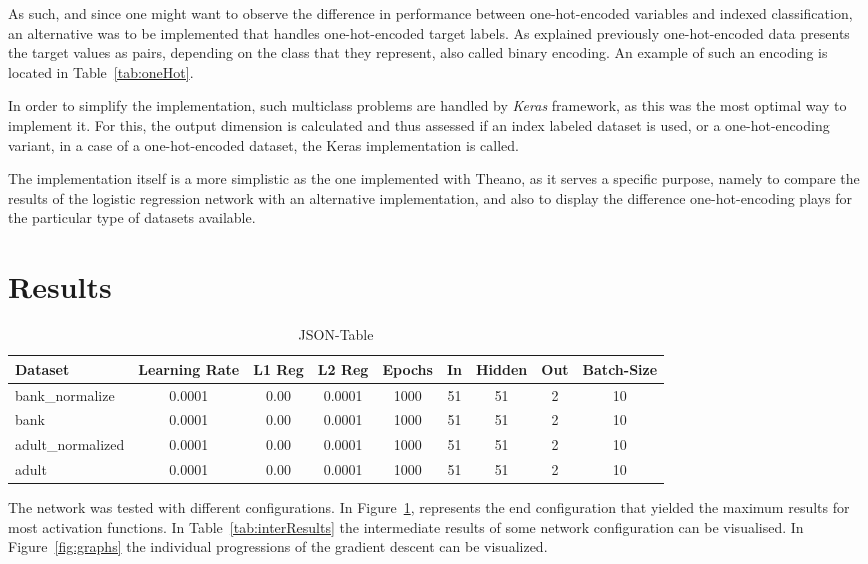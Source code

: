 \documentclass[12pt]{article}
\begin{document}
As such, and since one might want to observe the difference in performance between one-hot-encoded variables and indexed classification, an alternative was to be implemented that handles one-hot-encoded target labels. As explained previously one-hot-encoded data presents the target values as pairs, depending on the class that they represent, also called binary encoding. An example of such an encoding is located in Table~\ref{tab:oneHot}.

In order to simplify the implementation, such multiclass problems are handled by \emph{Keras} framework, as this was the most optimal way to implement it. For this, the output dimension is calculated and thus assessed if an index labeled dataset is used, or a one-hot-encoding variant, in a case of a one-hot-encoded dataset, the Keras implementation is called. 

The implementation itself is a more simplistic as the one implemented with Theano, as it serves a specific purpose, namely to compare the results of the logistic regression network with an alternative implementation, and also to display the difference one-hot-encoding plays for the particular type of datasets available.

\section{Results}
\label{sec:results}

\begin{table}[h]
   \centering
   \caption{JSON-Table}
   \label{tab:JSON}
   \begin{tabular}{lcccccccc}\toprule
        Dataset & Learning Rate & L1 Reg & L2 Reg & Epochs & In & Hidden & Out & Batch-Size \\
        \midrule
        bank\_normalize & 0.0001 & 0.00 & 0.0001 & 1000 & 51 & 51 & 2 & 10 \\
        bank & 0.0001 & 0.00 & 0.0001 & 1000 & 51 & 51 & 2 & 10 \\
        adult\_normalized & 0.0001 & 0.00 & 0.0001 & 1000 & 51 & 51 & 2 & 10 \\
        adult & 0.0001 & 0.00 & 0.0001 & 1000 & 51 & 51 & 2 & 10 \\ 
        \bottomrule
   \end{tabular}
\end{table}
The network was tested with different configurations. In Figure~\ref{tab:JSON}, represents the end configuration that yielded the maximum results for most activation functions. In Table~\ref{tab:interResults} the intermediate results of some network configuration can be visualised. In Figure~\ref{fig:graphs} the individual progressions of the gradient descent can be visualized.
\end{document}
